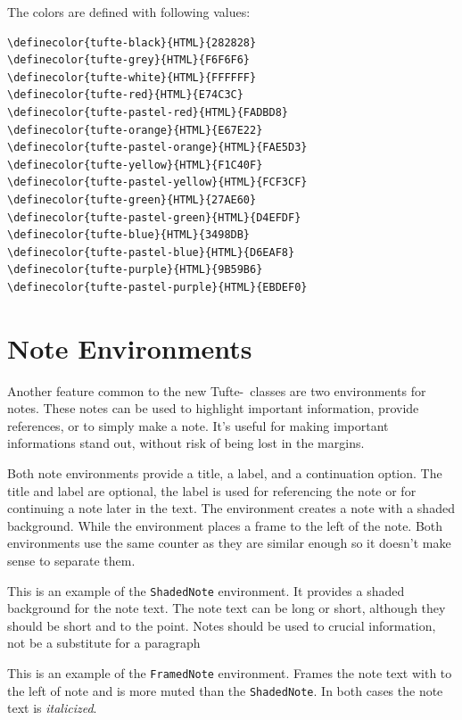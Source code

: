 \documentclass[a4paper]{tufte-handout}
\newcommand{\TL}{Tufte-\hologo{LaTeX}\xspace}
\begin{document}
The colors are defined with following values:
\begin{Verbatim}
\definecolor{tufte-black}{HTML}{282828}
\definecolor{tufte-grey}{HTML}{F6F6F6}
\definecolor{tufte-white}{HTML}{FFFFFF}
\definecolor{tufte-red}{HTML}{E74C3C}
\definecolor{tufte-pastel-red}{HTML}{FADBD8}
\definecolor{tufte-orange}{HTML}{E67E22}
\definecolor{tufte-pastel-orange}{HTML}{FAE5D3}
\definecolor{tufte-yellow}{HTML}{F1C40F}
\definecolor{tufte-pastel-yellow}{HTML}{FCF3CF}
\definecolor{tufte-green}{HTML}{27AE60}
\definecolor{tufte-pastel-green}{HTML}{D4EFDF}
\definecolor{tufte-blue}{HTML}{3498DB}
\definecolor{tufte-pastel-blue}{HTML}{D6EAF8}
\definecolor{tufte-purple}{HTML}{9B59B6}
\definecolor{tufte-pastel-purple}{HTML}{EBDEF0}
\end{Verbatim}

\section{Note Environments}\label{sec:note-environments}
Another feature common to the new \TL\ classes are two environments for notes.
These notes can be used to highlight important information, provide references, or to simply make a note.
It's useful for making important informations stand out, without risk of being lost in the margins.

Both note environments provide a title, a label, and a continuation option.
The title and label are optional, the label is used for referencing the note or for continuing a note later in the text.
The  environment creates a note with a shaded background. 
While the  environment places a frame to the left of the note. 
Both environments use the same counter as they are similar enough so it doesn't make sense to separate them.

\begin{ShadedNote}
  This is an example of the \texttt{ShadedNote} environment.
  It provides a shaded background for the note text. 
  The note text can be long or short, although they should be short and to the point.
  Notes should be used to crucial information, not be a substitute for a paragraph
\end{ShadedNote}

\begin{FramedNote}[
  name={Note Title},
  label={fn:label}
  ]
  This is an example of the \texttt{FramedNote} environment.
  Frames the note text with to the left of note and is more muted than the \texttt{ShadedNote}.
  In both cases the note text is \textit{italicized}.
\end{FramedNote}
\end{document}
